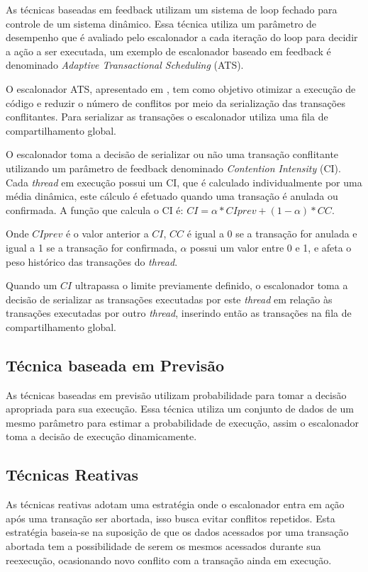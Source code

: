 \documentclass[ti]{texufpel} %
\begin{document}
As técnicas baseadas em feedback utilizam um sistema de loop fechado para controle de um sistema dinâmico. Essa técnica utiliza um parâmetro de desempenho que é avaliado pelo escalonador a cada iteração do loop para decidir a ação a ser executada, um exemplo de escalonador baseado em feedback é denominado \emph{Adaptive Transactional Scheduling} (ATS).

O escalonador ATS, apresentado em \cite{yoo08}, tem como objetivo otimizar a execução de código e reduzir o número de conflitos por meio da serialização das transações conflitantes. Para serializar as transações o escalonador utiliza uma fila de compartilhamento global.

O escalonador toma a decisão de serializar ou não uma transação conflitante utilizando um parâmetro de feedback denominado \emph{Contention Intensity} (CI). Cada \emph{thread} em execução possui um CI, que é calculado individualmente por uma média dinâmica, este cálculo é efetuado quando uma transação é anulada ou confirmada. A função que calcula o CI é: $CI = \alpha * CIprev + (1 - \alpha) * CC$.

Onde $CIprev$ é o valor anterior a $CI$, $CC$ é igual a 0 se a transação for anulada e igual a 1 se a transação for confirmada, $\alpha$ possui um valor entre 0 e 1, e afeta o peso histórico das transações do \emph{thread}.

Quando um $CI$ ultrapassa o limite previamente definido, o escalonador toma a decisão de serializar as transações executadas por este \emph{thread} em relação às transações executadas por outro \emph{thread}, inserindo então as transações na fila de compartilhamento global.


\subsection{Técnica baseada em Previsão}

As técnicas baseadas em previsão utilizam probabilidade para tomar a decisão apropriada para sua execução. Essa técnica utiliza um conjunto de dados de um mesmo parâmetro para estimar a probabilidade de execução, assim o escalonador toma a decisão de execução dinamicamente.

\subsection{Técnicas Reativas}

As técnicas reativas adotam uma estratégia onde o escalonador entra em ação após uma transação ser abortada, isso busca evitar conflitos repetidos. Esta estratégia baseia-se na suposição de que os dados acessados por uma transação abortada tem a possibilidade de serem os mesmos acessados durante sua reexecução, ocasionando novo conflito com a transação ainda em execução.
\end{document}
